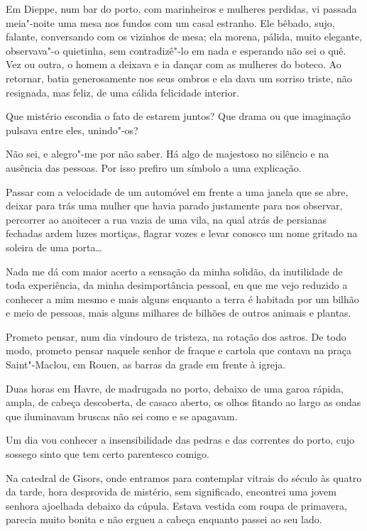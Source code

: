 \asterisc

Em Dieppe, num bar do porto, com marinheiros e mulheres perdidas, vi
passada meia"-noite uma mesa nos fundos com um casal estranho. Ele
bêbado, sujo, falante, conversando com os vizinhos de mesa; ela morena,
pálida, muito elegante, observava"-o quietinha, sem contradizê"-lo em nada
e esperando não sei o quê. Vez ou outra, o homem a deixava e ia dançar
com as mulheres do boteco. Ao retornar, batia generosamente nos seus
ombros e ela dava um sorriso triste, não resignada, mas feliz, de uma
cálida felicidade interior.

Que mistério escondia o fato de estarem juntos? Que drama ou que
imaginação pulsava entre eles, unindo"-os?

Não sei, e alegro"-me por não saber. Há algo de majestoso no silêncio e
na ausência das pessoas. Por isso prefiro um símbolo a uma explicação.

\asterisc

Passar com a velocidade de um automóvel em frente a uma janela que se
abre, deixar para trás uma mulher que havia parado justamente para nos
observar, percorrer ao anoitecer a rua vazia de uma vila, na qual atrás
de persianas fechadas ardem luzes mortiças, flagrar vozes e levar
conosco um nome gritado na soleira de uma porta\ldots{}

Nada me dá com maior acerto a sensação da minha solidão, da inutilidade
de toda experiência, da minha desimportância pessoal, eu que me vejo
reduzido a conhecer a mim mesmo e mais alguns enquanto a terra é
habitada por um bilhão e meio de pessoas, mais alguns milhares de
bilhões de outros animais e plantas.

Prometo pensar, num dia vindouro de tristeza, na rotação dos astros. De
todo modo, prometo pensar naquele senhor de fraque e cartola que
contava na praça Saint"-Maclou, em Rouen, as barras da grade em frente à
igreja.

\asterisc

Duas horas em Havre, de madrugada no porto, debaixo de uma garoa
rápida, ampla, de cabeça descoberta, de casaco aberto, os olhos fitando
ao largo as ondas que iluminavam bruscas não sei como e se apagavam.

Um dia vou conhecer a insensibilidade das pedras e das correntes do
porto, cujo sossego sinto que tem certo parentesco comigo.

\asterisc

Na catedral de Gisors, onde entramos para contemplar vitrais do
século  às quatro da tarde, hora desprovida de mistério, sem
significado, encontrei uma jovem senhora ajoelhada debaixo da
cúpula. Estava vestida com roupa de primavera, parecia muito bonita e
não ergueu a cabeça enquanto passei ao seu lado.

